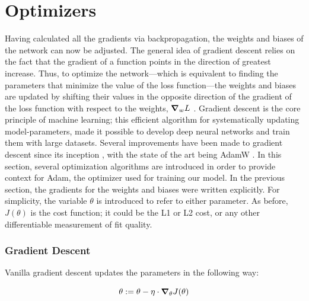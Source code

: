 \section{Optimizers}
Having calculated all the gradients via backpropagation, the weights and biases of the network can now be adjusted. The general idea of gradient descent relies on the fact that the gradient of a function points in the direction of greatest increase. Thus, to optimize the network---which is equivalent to finding the parameters that minimize the value of the loss function---the weights and biases are updated by shifting their values in the opposite direction of the gradient of the loss function with respect to the weights, $ \grad_w L $ . Gradient descent is the core principle of machine learning; this efficient algorithm for systematically updating model-parameters, made it possible to develop deep neural networks and train them with large datasets. Several improvements have been made to gradient descent since its inception \cite{cauchy-orig-grad-descent}, with the state of the art being AdamW \cite{AdamW-orig}. In this section, several optimization algorithms are introduced in order to provide context for Adam, the optimizer used for training our model. In the previous section, the gradients for the weights and biases were written explicitly. For simplicity, the variable $ \theta $ is introduced to refer to either parameter. As before, $ J(\theta) $  is the cost function; it could be the L1 or L2 cost, or any other differentiable measurement of fit quality.

\subsubsection{Gradient Descent}
Vanilla gradient descent \cite{gradient-descent-rev-article} updates the parameters in the following way:

\begin{equation}
    \label{batch-grad-descent}
    \theta := \theta - \eta \cdot \grad_\theta J(\theta)
\end{equation}

